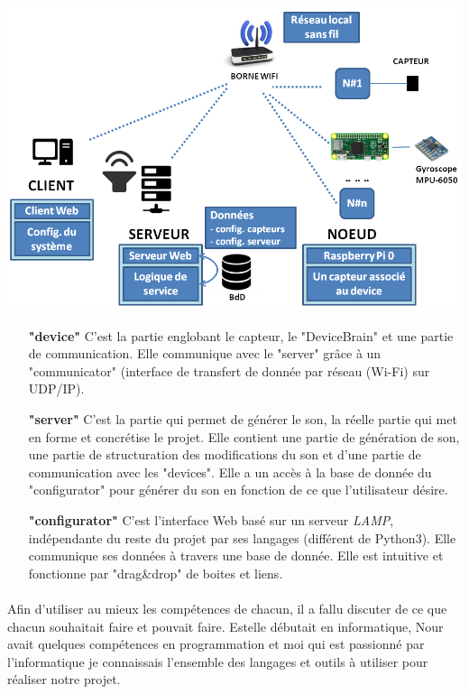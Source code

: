 \documentclass[12pt]{article}
\begin{document}
	\noindent
	\includegraphics[width=\textwidth]{overall_sheme}
	\begin{itemize}
		\item[\textbf{"device"}] C'est la partie englobant le capteur, le "DeviceBrain" et une partie de communication. Elle communique avec le "server" grâce à un "communicator" (interface de transfert de donnée par réseau (Wi-Fi) sur UDP/IP).
		\item[\textbf{"server"}] C'est la partie qui permet de générer le son, la réelle partie qui met en forme et concrétise le projet. Elle contient une partie de génération de son, une partie de structuration des modifications du son et d'une partie de communication avec les "devices". Elle a un accès à la base de donnée du "configurator" pour générer du son en fonction de ce que l'utilisateur désire.
		\item[\textbf{"configurator"}] C'est l'interface Web basé sur un serveur \textit{LAMP}, indépendante du reste du projet par ses langages (différent de Python3). Elle communique ses données à travers une base de donnée. Elle est intuitive et fonctionne par "drag\&drop" de boites et liens.
	\end{itemize}
	
	\paragraph{}
	Afin d’utiliser au mieux les compétences de chacun, il a fallu discuter de ce que chacun souhaitait faire et pouvait faire. Estelle débutait en informatique, Nour avait quelques compétences en programmation et moi qui est passionné par l’informatique je connaissais l’ensemble des langages et outils à utiliser pour réaliser notre projet.
	
\end{document}
